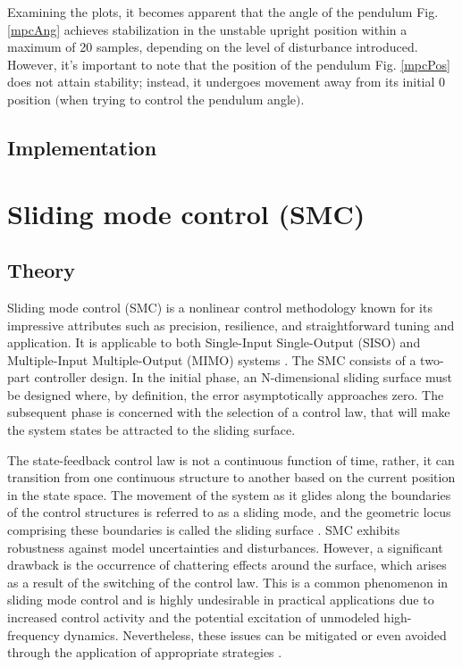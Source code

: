 Examining the plots, it becomes apparent that the angle of the pendulum Fig. \ref{mpcAng} achieves stabilization in the unstable upright position within a maximum of 20 samples, depending on the level of disturbance introduced. However, it's important to note that the position of the pendulum Fig. \ref{mpcPos} does not attain stability; instead, it undergoes movement away from its initial 0 position $($when trying to control the pendulum angle$)$.

\subsection{Implementation}

\newpage
\section{Sliding mode control (SMC)}
\subsection{Theory}

Sliding mode control (SMC) is a nonlinear control methodology known for its impressive attributes such as precision, resilience, and straightforward tuning and application. It is applicable to both Single-Input Single-Output (SISO) and Multiple-Input Multiple-Output (MIMO) systems \cite{slidingLecture}\cite{Decarlo2008AQI}. The SMC consists of a two-part controller design. In the initial phase, an N-dimensional sliding surface must be designed where, by definition, the error asymptotically approaches zero. The subsequent phase is concerned with the selection of a control law, that will make the system states be attracted to the sliding surface.

The state-feedback control law is not a continuous function of time, rather, it can transition from one continuous structure to another based on the current position in the state space. The movement of the system as it glides along the boundaries of the control structures is referred to as a sliding mode, and the geometric locus comprising these boundaries is called the sliding surface \cite{wikiSMC}. SMC exhibits robustness against model uncertainties and disturbances. However, a significant drawback is the occurrence of chattering effects around the surface, which arises as a result of the switching of the control law. This is a common phenomenon in sliding mode control and is highly undesirable in practical applications due to increased control activity and the potential excitation of unmodeled high-frequency dynamics. Nevertheless, these issues can be mitigated or even avoided through the application of appropriate strategies \cite{slidingLecture}.

